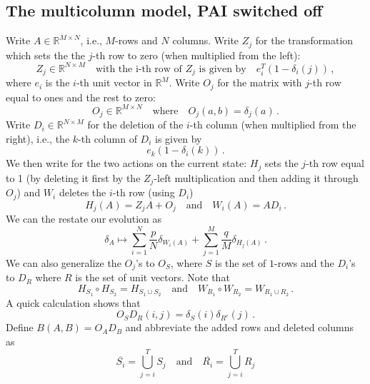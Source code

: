 \documentclass{article}
\numberwithin{equation}{section}
\newcommand{\R}     {\mathbb{R}}
\newcommand{\1}{\mathbbm{1}}
\begin{document}
\subsection{The multicolumn model, PAI switched off}
Write $A\in \R^{M\times N}$, i.e., $M$-rows and $N$ columns. Write $Z_j$ for the transformation which sets the the $j$-th row to zero (when multiplied from the left):
\begin{equation}
    Z_j\in\R^{N\times M}\quad\text{with the i-th row of }Z_j\text{ is given by}\quad e_i^T(1-\delta_i(j))\, ,
\end{equation}
 where $e_i$ is the $i$-th unit vector in $\R^M$. Write $O_j$ for the matrix with $j$-th row equal to ones and the rest to zero:
 \begin{equation}
     O_j\in\R^{M\times N}\quad\text{where}\quad O_j(a,b)=\delta_j(a)\, .
 \end{equation}
Write $D_i\in\R^{N\times M}$ for the deletion of the $i$-th column (when multiplied from the right), i.e., the $k$-th column of $D_i$ is given by
\begin{equation}
    e_k(1-\delta_i(k))\, .
\end{equation}
We then write for the two actions on the current state: $H_j$ sets the $j$-th row equal to 1 (by deleting it first by the $Z_j$-left multiplication and then adding it through $O_j$) and $ W_i$ deletes the $i$-th row (using $D_i$)
\begin{equation}
    H_j(A)=Z_jA+O_j\quad \text{and}\quad W_i(A)=AD_i\, .
\end{equation}
We can the restate our evolution as
\begin{equation}
    \delta_A\mapsto \sum_{i=1}^N\frac{p}{N}\delta_{W_i(A)}+\sum_{j=1}^M \frac{q}{M}\delta_{H_j(A)}\, .
\end{equation}
We can also generalize the $O_j$'s to $O_S$, where $S$ is the set of $1$-rows and the $D_i$'s to $D_R$ where $R$ is the set of unit vectors. Note that
\begin{equation}
    H_{S_1}\circ H_{S_2}=H_{S_1\cup S_2}\quad\text{and}\quad W_{R_1}\circ W_{R_2}=W_{R_1\cup R_2}\, .
\end{equation}
A quick calculation shows that
\begin{equation}
    O_SD_R(i,j)=\delta_S(i)\delta_{R^c}(j)\, .
\end{equation}
Define $B(A,B)=O_AD_B$ and abbreviate the added rows and deleted columns as
\begin{equation}
    \overline{S_i}=\bigcup_{j=i}^TS_j\quad\text{and}\quad  \overline{R_i}=\bigcup_{j=i}^TR_j
\end{equation}
\end{document}
